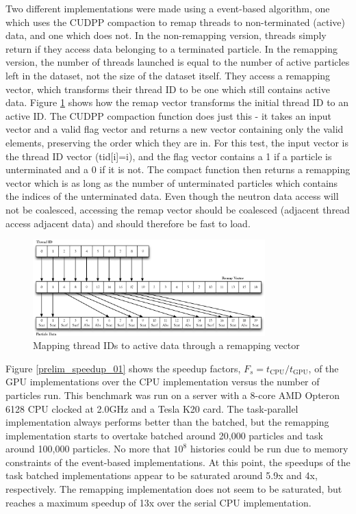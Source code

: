 Two different implementations were made using a event-based algorithm, one which uses the CUDPP compaction to remap threads to non-terminated (active) data, and one which does not.  In the non-remapping version, threads simply return if they access data belonging to a terminated particle.  In the remapping version, the number of threads launched is equal to the number of active particles left in the dataset, not the size of the dataset itself.  They access a remapping vector, which transforms their thread ID to be one which still contains active data.  Figure \ref{remapping} shows how the remap vector transforms the initial thread ID to an active ID.  The CUDPP compaction function does just this - it takes an input vector and a valid flag vector and returns a new vector containing only the valid elements, preserving the order which they are in.  For this test, the input vector is the thread ID vector (tid[i]=i), and the flag vector contains a 1 if a particle is unterminated and a 0 if it is not.  The compact function then returns a remapping vector which is as long as the number of unterminated particles which contains the indices of the unterminated data.  Even though the neutron data access will not be coalesced, accessing the remap vector should be coalesced (adjacent thread access adjacent data) and should therefore be fast to load.

\begin{figure}[h!] 
  \centering
    \includegraphics[width=0.8\textwidth]{graphics/remapping_horiz.eps}
     \caption{Mapping thread IDs to active data through a remapping vector \label{remapping} }
\end{figure}

Figure \ref{prelim_speedup_01} shows the speedup factors, $F_s=t_\mathrm{CPU}/t_\mathrm{GPU}$, of the GPU implementations over the CPU implementation versus the number of particles run.  This benchmark was run on a server with a 8-core AMD Opteron 6128 CPU clocked at 2.0GHz and a Tesla K20 card.  The task-parallel implementation always performs better than the batched, but the remapping implementation starts to overtake batched around 20,000 particles and task around 100,000 particles.  No more that $10^8$ histories could be run due to memory constraints of the event-based implementations.  At this point, the speedups of the task batched implementations appear to be saturated around 5.9x and 4x, respectively.  The remapping implementation does not seem to be saturated, but reaches a maximum speedup of 13x over the serial CPU implementation.  

